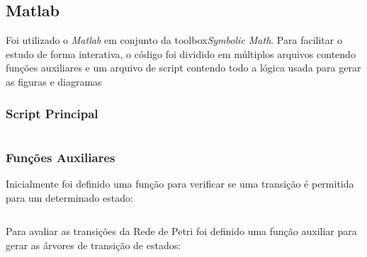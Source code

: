 \documentclass[a4paper,11pt]{article}
\begin{document}
\subsection*{Matlab}

Foi utilizado o \textit{Matlab} em conjunto da toolbox\textit{Symbolic Math}\cite{matlabsymbolic}. Para facilitar o estudo de forma interativa, o código foi dividido em múltiplos arquivos contendo funções auxiliares e um arquivo de script contendo todo a lógica usada para gerar as figuras e diagramas

\subsubsection*{Script Principal}

\inputminted[xleftmargin=15pt,linenos,frame=single,framesep=5pt,breaklines=true]{matlab}{../matlab/petrinetproject.m}

\subsubsection*{Funções Auxiliares}

Inicialmente foi definido uma função para verificar se uma transição é permitida para um determinado estado:

\inputminted[xleftmargin=15pt,linenos,frame=single,framesep=5pt,breaklines=true]{matlab}{../matlab/petristate.m}

Para avaliar as transições da Rede de Petri foi definido uma função auxiliar para gerar as árvores de transição de estados:

\inputminted[xleftmargin=15pt,linenos,frame=single,framesep=5pt,breaklines=true]{matlab}{../matlab/dotpetree.m}

\end{document}
